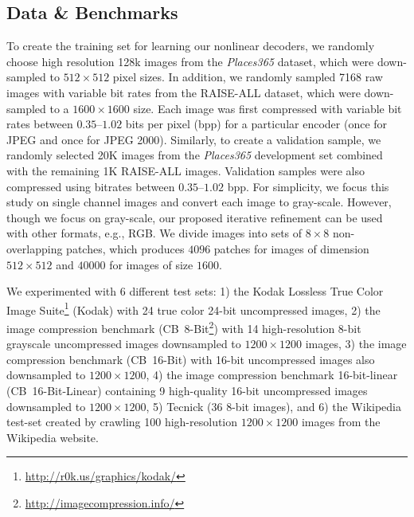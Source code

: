 \documentclass[smallabstract,smallcaptions]{dccpaper}
\begin{document}
\subsection{Data \& Benchmarks}
\label{exp:data}
To create the training set for learning our nonlinear decoders, we randomly choose high resolution 128k images from the \emph{Places365}{\cite{zhou2017places}} dataset, which were down-sampled to $512\times512$ pixel sizes. In addition, we randomly sampled 7168 raw images with variable bit rates from the RAISE-ALL{\cite{Raise}} dataset, which were down-sampled to a $1600\times1600$ size. Each image was first compressed with variable bit rates between $0.35$--$1.02$ bits per pixel (bpp) for a particular encoder (once for JPEG and once for JPEG 2000). Similarly, to create a validation sample, we randomly selected 20K images from the \emph{Places365} development set combined with the remaining 1K RAISE-ALL images. Validation samples were also compressed using bitrates between $0.35$--$1.02$ bpp.
For simplicity, we focus this study on single channel images and convert each image to gray-scale. However, though we focus on gray-scale, our proposed iterative refinement can be used with other formats, e.g., RGB. We divide images into sets of $8\times8$ non-overlapping patches, which produces $4096$ patches for images of dimension $512\times512$ and $40000$ for images of size $1600$.


We experimented with $6$ different test sets: 1) the Kodak Lossless True Color Image Suite\footnote{\url{http://r0k.us/graphics/kodak/}} (Kodak) with 24 true color 24-bit uncompressed images, 2) the image compression benchmark (CB~8-Bit\footnote{\url{http://imagecompression.info/}}) with 14 high-resolution 8-bit grayscale uncompressed images downsampled to $1200\times1200$ images, 3) the image compression benchmark (CB~16-Bit) with 16-bit uncompressed images also downsampled to $1200\times1200$, 4) the image compression benchmark 16-bit-linear (CB~16-Bit-Linear) containing 9 high-quality 16-bit uncompressed images downsampled to $1200\times1200$, 5) Tecnick {\cite{teck}} (36 8-bit images), and 6) the Wikipedia test-set created by crawling 100 high-resolution $1200\times1200$ images from the Wikipedia website.
\end{document}
